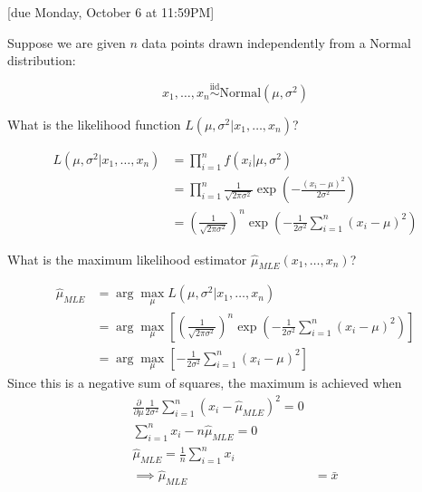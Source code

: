 \documentclass{article}
\newcommand{\iid}{\stackrel{\text{iid}}{\sim}}
\begin{document}
[due Monday, October 6 at 11:59PM]

\begin{probset}
\begin{prob}
Suppose we are given $n$ data points drawn independently from a Normal distribution:

\[ x_1, \dots, x_n \iid \text{Normal}(\mu, \sigma^2) \]

\begin{subprobset}
    \begin{subprob}
        What is the likelihood function $L(\mu, \sigma^2 | x_1, \dots, x_n)$?

        \begin{soln}
            \begin{align*}
                L(\mu, \sigma^2 | x_1, \dots, x_n) &= \prod_{i=1}^n f(x_i | \mu, \sigma^2) \\
                &= \prod_{i=1}^n \frac{1}{\sqrt{2\pi\sigma^2}} \exp\left(-\frac{(x_i - \mu)^2}{2\sigma^2}\right) \\
                &= \left(\frac{1}{\sqrt{2\pi\sigma^2}}\right)^n \exp\left(-\frac{1}{2\sigma^2} \sum_{i=1}^n (x_i - \mu)^2\right)
            \end{align*}
        \end{soln}
    \end{subprob}

    \begin{subprob}
        What is the maximum likelihood estimator $\hat{\mu}_{MLE}(x_1, \dots, x_n)$?

        \begin{soln}
            \begin{align*}
                \hat{\mu}_{MLE} &= \arg\max_{\mu} L(\mu, \sigma^2 | x_1, \dots, x_n) \\
                &= \arg\max_{\mu} \left[ \left(\frac{1}{\sqrt{2\pi\sigma^2}}\right)^n \exp\left(-\frac{1}{2\sigma^2} \sum_{i=1}^n (x_i - \mu)^2\right) \right] \\
                &= \arg\max_{\mu} \left[ -\frac{1}{2\sigma^2} \sum_{i=1}^n (x_i - \mu)^2 \right]
            \end{align*}
            Since this is a negative sum of squares, the maximum is achieved when 
            \begin{align*}
                \frac{\partial}{\partial \mu} \frac{1}{2\sigma^2} \sum_{i=1}^n (x_i - \hat{\mu}_{MLE})^2 = 0 \\
                \sum_{i=1}^n x_i - n\hat{\mu}_{MLE} = 0 \\
                \hat{\mu}_{MLE} = \frac{1}{n} \sum_{i=1}^n x_i \\
                \implies \hat{\mu}_{MLE} &= \bar{x}
            \end{align*}
        \end{soln}
    \end{subprob}


\end{subprobset}
\end{prob}
\end{probset}
\end{document}
